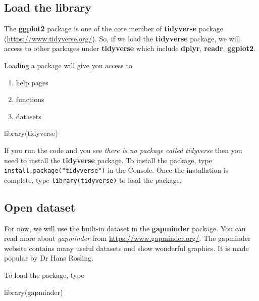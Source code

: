 \documentclass[
]{book}
\makeatletter
\newenvironment{Shaded}{\begin{snugshade}}{\end{snugshade}}
\newcommand{\FunctionTok}[1]{\textcolor[rgb]{0,0,0}{#1}}
\newcommand{\NormalTok}[1]{#1}
\providecommand{\tightlist}{%
  \setlength{\itemsep}{0pt}\setlength{\parskip}{0pt}}
\newenvironment{kframe}{%
\medskip{}
\setlength{\fboxsep}{.8em}
 \def\at@end@of@kframe{}%
 \ifinner\ifhmode%
  \def\at@end@of@kframe{\end{minipage}}%
  \begin{minipage}{\columnwidth}%
 \fi\fi%
 \def\FrameCommand##1{\hskip\@totalleftmargin \hskip-\fboxsep
 \colorbox{shadecolor}{##1}\hskip-\fboxsep
     \hskip-\linewidth \hskip-\@totalleftmargin \hskip\columnwidth}%
 \MakeFramed {\advance\hsize-\width
   \@totalleftmargin\z@ \linewidth\hsize
   \@setminipage}}%
 {\par\unskip\endMakeFramed%
 \at@end@of@kframe}
\renewenvironment{Shaded}{\begin{kframe}}{\end{kframe}}
\makeatother
\begin{document}
\hypertarget{load-the-library}{%
\subsection{Load the library}\label{load-the-library}}

The \textbf{ggplot2} package is one of the core member of \textbf{tidyverse} package (\url{https://www.tidyverse.org/}). So, if we load the \textbf{tidyverse} package, we will access to other packages under \textbf{tidyverse} which include \textbf{dplyr}, \textbf{readr}, \textbf{ggplot2}.

Loading a package will give you access to

\begin{enumerate}
\def\labelenumi{\arabic{enumi}.}
\tightlist
\item
  help pages
\item
  functions
\item
  datasets
\end{enumerate}

\begin{Shaded}
\begin{Highlighting}[]
\FunctionTok{library}\NormalTok{(tidyverse)}
\end{Highlighting}
\end{Shaded}

If you run the code and you see \emph{there is no package called tidyverse} then you need to install the \textbf{tidyverse} package. To install the package, type \texttt{install.package("tidyverse")} in the Console. Once the installation is complete, type \texttt{library(tidyverse)} to load the package.

\hypertarget{open-dataset}{%
\subsection{Open dataset}\label{open-dataset}}

For now, we will use the built-in dataset in the \textbf{gapminder} package. You can read more about \emph{gapminder} from \url{https://www.gapminder.org/}. The gapminder website contains many useful datasets and show wonderful graphics. It is made popular by Dr Hans Rosling.

To load the package, type

\begin{Shaded}
\begin{Highlighting}[]
\FunctionTok{library}\NormalTok{(gapminder)}
\end{Highlighting}
\end{Shaded}
\end{document}
